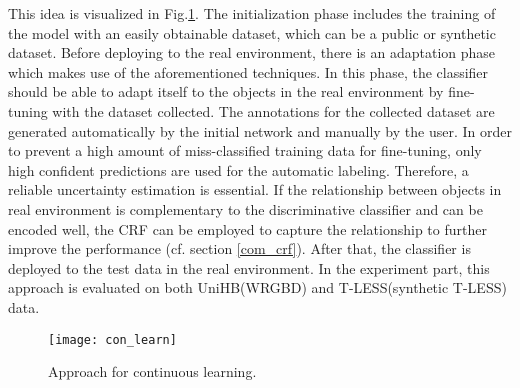 This idea is visualized in Fig.\ref{fig:con_learn}.
The initialization phase includes the training of the model with an easily obtainable dataset, which can be a public or synthetic dataset.
Before deploying to the real environment, there is an adaptation phase which makes use of the aforementioned techniques.
In this phase, the classifier should be able to adapt itself to the objects in the real environment by fine-tuning with the dataset collected. 
The annotations for the collected dataset are generated automatically by the initial network and manually by the user.
In order to prevent a high amount of miss-classified training data for fine-tuning, only high confident predictions are used for the automatic labeling.
Therefore, a reliable uncertainty estimation is essential.
If the relationship between objects in real environment is complementary to the discriminative classifier and can be encoded well, the \gls{CRF} can be employed to capture the relationship to further improve the performance (cf. section \ref{com_crf}).
After that, the classifier is deployed to the test data in the real environment.
In the experiment part, this approach is evaluated on both UniHB(\gls{WRGBD}) and T-LESS(synthetic T-LESS) data.
\begin{figure}[H]
	\begin{center}
		\texttt{[image: con\_learn]}
		\caption{Approach for continuous learning.}		
		\label{fig:con_learn}
	\end{center}
\end{figure}
